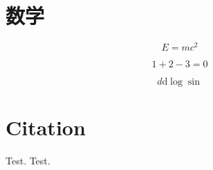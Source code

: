 \chapter{数学}

\begin{equation}
    E=mc^2
\end{equation}

\begin{equation}
1 + 2 - 3 = 0
\end{equation}

\begin{equation}
d\mathrm{d}\log \sin
\end{equation}


\chapter{Citation}

Test\cite{lamport85a}.
Test\cite{knuth86a}.
